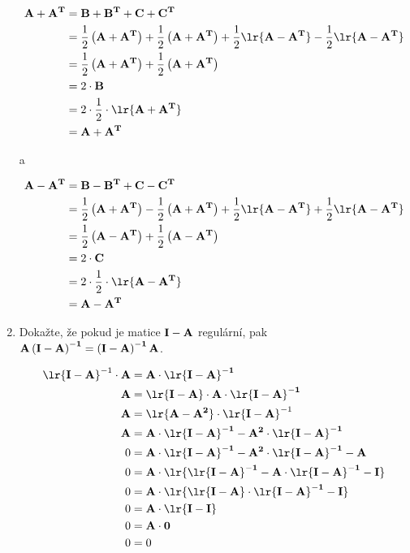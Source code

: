 \begin{enumerate}
    \begin{align*}
    \bf{A} + \bf{A}^T &= \bf{B} + \bf{B}^T + \bf{C} + \bf{C}^T \\
    &= \frac{1}{2} \left( \bf{A} + \bf{A}^T \right) + \frac{1}{2} \left( \bf{A} + \bf{A}^T \right) + \frac{1}{2} \lr{ \bf{A} - \bf{A}^T } - \frac{1}{2} \lr{ \bf{A} - \bf{A}^T } \\
    &= \frac{1}{2} \left( \bf{A} + \bf{A}^T \right) + \frac{1}{2} \left( \bf{A} + \bf{A}^T \right) \\
    &= 2 \cdot \bf{B} \\
    &= 2 \cdot \frac{1}{2} \cdot \lr{ \bf{A} + \bf{A}^T } \\
    &= \bf{A} + \bf{A}^T
    \end{align*}

    a

    \begin{align*}
    \bf{A} - \bf{A}^T &= \bf{B} - \bf{B}^T + \bf{C} - \bf{C}^T \\
    &= \frac{1}{2} \left( \bf{A} + \bf{A}^T \right) - \frac{1}{2} \left( \bf{A} + \bf{A}^T \right) + \frac{1}{2} \lr{ \bf{A} - \bf{A}^T } + \frac{1}{2} \lr{ \bf{A} - \bf{A}^T } \\
    &= \frac{1}{2} \left( \bf{A} - \bf{A}^T \right) + \frac{1}{2} \left( \bf{A} - \bf{A}^T \right) \\
    &= 2 \cdot \bf{C} \\
    &= 2 \cdot \frac{1}{2} \cdot \lr{ \bf{A} - \bf{A}^T } \\
    &= \bf{A} - \bf{A}^T
    \end{align*}

    \item Dokažte, že pokud je matice \( \bf{I} - \bf{A} \) regulární, pak \( \bf{A} \left( \bf{I} - \bf{A} \right)^{-1} = \left( \bf{I} - \bf{A} \right)^{-1} \bf{A} \).

    \begin{align*}
    \lr{ \bf{I} - \bf{A} }^{-1} \cdot \bf{A} &= \bf{A} \cdot \lr{ \bf{I} - \bf{A} }^{-1} \\
    \bf{A} &= \lr{\bf{I} - \bf{A}} \cdot \bf{A} \cdot \lr{ \bf{I} - \bf{A} }^{-1} \\
    \bf{A} &= \lr{\bf{A} - \bf{A}^2} \cdot \lr{\bf{I} - \bf{A}}^{-1} \\
    \bf{A} &= \bf{A} \cdot \lr{ \bf{I} - \bf{A} }^{-1} - \bf{A}^2 \cdot \lr{ \bf{I} - \bf{A} }^{-1} \\
    0 &= \bf{A} \cdot \lr{ \bf{I} - \bf{A} }^{-1} - \bf{A}^2 \cdot \lr{ \bf{I} - \bf{A} }^{-1} - \bf{A} \\
    0 &= \bf{A} \cdot \lr{ \lr{ \bf{I} - \bf{A} }^{-1} - \bf{A} \cdot \lr{ \bf{I} - \bf{A} }^{-1} - \bf{I} } \\
    0 &= \bf{A} \cdot \lr{ \lr{ \bf{I} - \bf{A} } \cdot \lr{ \bf{I} - \bf{A} }^{-1} -\bf{I} } \\
    0 &= \bf{A} \cdot  \lr{ \bf{I} - \bf{I} } \\
    0 &= \bf{A} \cdot 0 \\
    0 &= 0
    \end{align*}


\end{enumerate}
